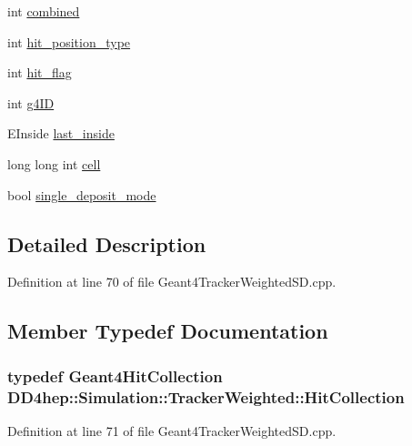 \begin{DoxyCompactItemize}
\item 
int \hyperlink{struct_d_d4hep_1_1_simulation_1_1_tracker_weighted_a7059ba8b2d85cb67220b0184f038f9f9}{combined}
\item 
int \hyperlink{struct_d_d4hep_1_1_simulation_1_1_tracker_weighted_a5120f0b661148efb35b7432c8c58c7ce}{hit\_\-position\_\-type}
\item 
int \hyperlink{struct_d_d4hep_1_1_simulation_1_1_tracker_weighted_a9ffa7f998b3a1f16864ecbb894ca2e54}{hit\_\-flag}
\item 
int \hyperlink{struct_d_d4hep_1_1_simulation_1_1_tracker_weighted_a1205a645db026a115eb182e439929818}{g4ID}
\item 
EInside \hyperlink{struct_d_d4hep_1_1_simulation_1_1_tracker_weighted_afc2a6289bb11f08b03d50e0b8e271083}{last\_\-inside}
\item 
long long int \hyperlink{struct_d_d4hep_1_1_simulation_1_1_tracker_weighted_aeced4bab28aa79ad7bab14ca9ce02c79}{cell}
\item 
bool \hyperlink{struct_d_d4hep_1_1_simulation_1_1_tracker_weighted_aca48801717dfd735529eb3fda99e999a}{single\_\-deposit\_\-mode}
\end{DoxyCompactItemize}


\subsection{Detailed Description}


Definition at line 70 of file Geant4TrackerWeightedSD.cpp.

\subsection{Member Typedef Documentation}
\hypertarget{struct_d_d4hep_1_1_simulation_1_1_tracker_weighted_a99a4be34af7901b0aab7398894ba906a}{
\subsubsection[{HitCollection}]{\setlength{\rightskip}{0pt plus 5cm}typedef {\bf Geant4HitCollection} {\bf DD4hep::Simulation::TrackerWeighted::HitCollection}}}
\label{struct_d_d4hep_1_1_simulation_1_1_tracker_weighted_a99a4be34af7901b0aab7398894ba906a}


Definition at line 71 of file Geant4TrackerWeightedSD.cpp.

